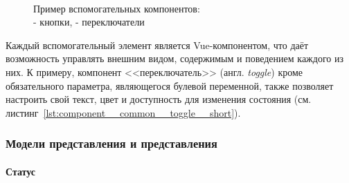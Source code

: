 \begin{figure}[h!]
  \centering
  \setlength{\fboxsep}{5pt}
  \\
  \vspace*{6pt}
  \caption{
    Пример вспомогательных компонентов:\\
    \protect{} - кнопки,
    \protect{} - переключатели
  }
  \label{fig:common-components}
\end{figure}

Каждый вспомогательный элемент является Vue-компонентом, что даёт возможность управлять внешним видом, содержимым и поведением каждого из них. К примеру, компонент <<переключатель>> (англ. \emph{toggle}) кроме обязательного параметра, являющегося булевой переменной, также позволяет настроить свой текст, цвет и доступность для изменения состояния (см. листинг~\ref{lst:component__common__toggle__short}).

\newpage




\subsubsection{Модели представления и представления}

\paragraph{Статус}

